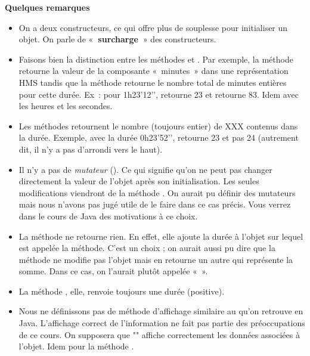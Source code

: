 		\textbf{Quelques remarques}
		\begin{itemize}
			\item
				On a deux constructeurs, ce qui offre plus de souplesse pour initialiser un objet. 
				On parle de «\textbf{~surcharge~}» des constructeurs.
			\item
				Faisons bien la distinction entre les méthodes
				 et . Par
				exemple, la méthode  retourne la valeur
				de la composante «~minutes~» dans une représentation HMS tandis que la
				méthode  retourne le nombre total
				de minutes entières pour cette durée. Ex~: pour 1h23’12’’,
				 retourne 23 et
				 retourne 83. 
				Idem avec les heures et les secondes.
			\item 
				Les méthodes  retournent le nombre
				(toujours entier) de XXX contenus dans la durée. Exemple, avec la durée
				0h23’52’’, 
				retourne 23 et pas 24 (autrement dit, il n’y a pas d’arrondi vers le
				haut).
			\item 
				Il n’y a pas de \textit{mutateur} (). 
				Ce qui signifie qu’on ne peut pas changer directement la valeur de l’objet
				après son initialisation. 
				Les seules modifications viendront de la méthode .
				On aurait pu définir des mutateurs mais nous
				n'avons pas jugé utile de le faire dans ce cas précis.
				Vous verrez dans le cours de Java des motivations à ce choix.
			\item 
				La méthode  ne retourne rien. En effet,
				elle ajoute la durée à l’objet sur lequel est appelée la méthode. C’est
				un choix ; on aurait aussi pu dire que la méthode ne modifie pas
				l’objet mais en retourne un autre qui représente la somme. Dans ce cas,
				on l’aurait plutôt appelée «~».
			\item 
				La méthode , elle, renvoie toujours une
				durée (positive).
			\item 
				Nous ne définissons pas de méthode d'affichage
				similaire au  qu'on retrouve en Java.
				L'affichage correct de l'information ne fait pas partie
				des préoccupations de ce cours.
				On supposera que ""
				affiche correctement les données associées à l'objet.
				Idem pour la méthode .
		\end{itemize}
	

